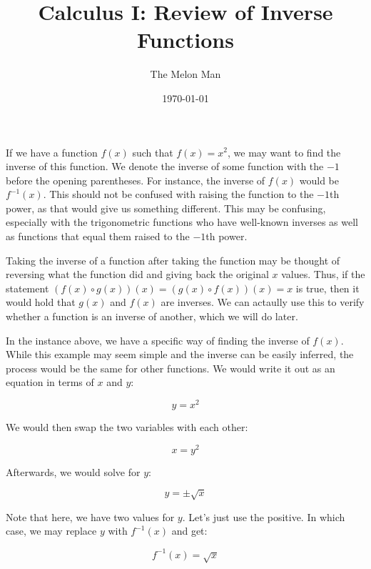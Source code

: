 \documentclass[12pt]{article}
\title{Calculus I: Review of Inverse Functions}
\author{The Melon Man}
\date{\today}
\begin{document}
\maketitle

If we have a function $f(x)$ such that $f(x)=x^2$, we may want to find the inverse of this function.
We denote the inverse of some function with the $-1$ before the opening parentheses.
For instance, the inverse of $f(x)$ would be $f^{-1}(x)$.
This should not be confused with raising the function to the $-1$th power, as that would give us something different.
This may be confusing, especially with the trigonometric functions who have well-known inverses as well as functions that equal them raised to the $-1$th power.

Taking the inverse of a function after taking the function may be thought of reversing what the function did and giving back the original $x$ values.
Thus, if the statement $(f(x) \circ g(x))(x) = (g(x) \circ f(x))(x) = x$ is true, then it would hold that $g(x)$ and $f(x)$ are inverses.
We can actaully use this to verify whether a function is an inverse of another, which we will do later.

In the instance above, we have a specific way of finding the inverse of $f(x)$.
While this example may seem simple and the inverse can be easily inferred, the process would be the same for other functions.
We would write it out as an equation in terms of $x$ and $y$:

\begin{equation}
    y = x^2
\end{equation}

We would then swap the two variables with each other:

\begin{equation}
    x = y^2
\end{equation}

Afterwards, we would solve for $y$:

\begin{equation}
    y = \pm \sqrt{x}
\end{equation}

Note that here, we have two values for $y$.
Let's just use the positive.
In which case, we may replace $y$ with $f^{-1}(x)$ and get:

\begin{equation}
    f^{-1}(x) = \sqrt{x}
\end{equation}
\end{document}
